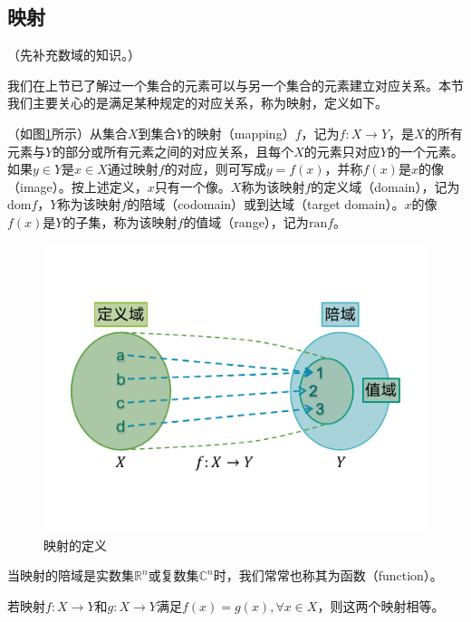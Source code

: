 \documentclass[main.tex]{subfiles}
\begin{document}
\subsection{映射}
（先补充数域的知识。）

我们在上节已了解过一个集合的元素可以与另一个集合的元素建立对应关系。本节我们主要关心的是满足某种规定的对应关系，称为映射，定义如下。

\begin{definition}[映射]
（如图\ref{fig:II.1.1}所示）从集合$X$到集合$Y$的映射（mapping）$f$，记为$f:X\rightarrow Y$，是$X$的所有元素与$Y$的部分或所有元素之间的对应关系，且每个$X$的元素只对应$Y$的一个元素。如果$y\in Y$是$x\in X$通过映射$f$的对应，则可写成$y=f\left(x\right)$，并称$f\left(x\right)$是$x$的像（image）。按上述定义，$x$只有一个像。$X$称为该映射$f$的定义域（domain），记为$\mathrm{dom}f$，$Y$称为该映射$f$的陪域（codomain）或到达域（target domain）。$x$的像$f\left(x\right)$是$Y$的子集，称为该映射$f$的值域（range），记为$\mathrm{ran}f$。
\end{definition}

\begin{figure}[htbp]
\centering
\includegraphics{images/II.1.1.pdf}
\caption{映射的定义}
\label{fig:II.1.1}
\end{figure}

当映射的陪域是实数集$\mathbb{R}^n$或复数集$\mathbb{C}^n$时，我们常常也称其为函数（function）。

\begin{definition}[映射的相等]
若映射$f:X\rightarrow Y$和$g:X\rightarrow Y$满足$f\left(x\right)=g\left(x\right),\forall x\in X$，则这两个映射相等。
\end{definition}
\end{document}
